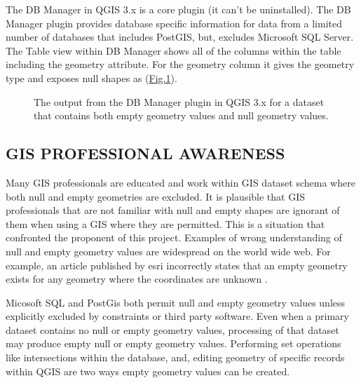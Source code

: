 \documentclass[letterpaper,11pt,english]{sphinxmanual}
\begin{document}
The DB Manager in QGIS 3.x is a core plugin (it can’t be uninstalled).  The DB Manager plugin provides database specific information for data from a limited number of databases that includes PostGIS, but, excludes Microsoft SQL Server.  The Table view within DB Manager shows all of the columns within the table including the geometry attribute.  For the geometry column it gives the geometry type and exposes null shapes as  (\hyperref[\detokenize{concept:figureiv}]{Fig.\@ \ref{\detokenize{concept:figureiv}}}).

\begin{figure}[htbp]
\centering
\capstart

\noindent{}
\caption{The output from the DB Manager plugin in QGIS 3.x for a dataset that contains both empty geometry values and null geometry values.}\label{\detokenize{concept:id65}}\label{\detokenize{concept:figureiv}}\end{figure}


\subsection{GIS PROFESSIONAL AWARENESS}
\label{\detokenize{concept:gis-professional-awareness}}
Many GIS professionals are educated and work within GIS dataset schema where both null and empty geometries are excluded.  It is plausible that GIS professionals that are not familiar with null and empty shapes are ignorant of them when using a GIS where they are permitted.  This is a situation that confronted the proponent of this project.  Examples of wrong understanding of null and empty geometry values are widespread on the world wide web.  For example, an article published by esri incorrectly states that an empty geometry exists for any geometry where the coordinates are unknown .

Micosoft SQL and PostGis both permit null and empty geometry values unless explicitly excluded by constraints or third party software.  Even when a primary dataset contains no null or empty geometry values, processing of that dataset may produce empty null or empty geometry values.  Performing set operations like intersections within the database, and, editing geometry of specific records within QGIS are two ways empty geometry values can be created.
\end{document}
